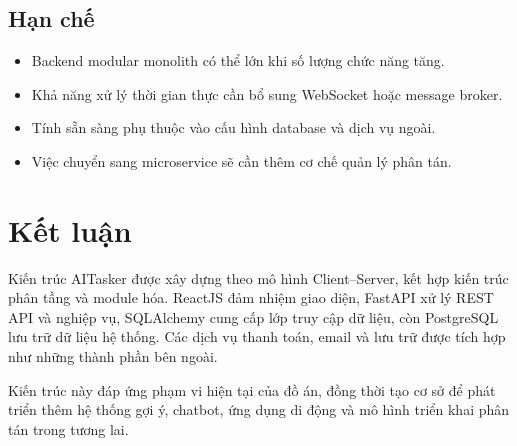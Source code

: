 \subsection{Hạn chế}

\begin{itemize}
    \item Backend modular monolith có thể lớn khi số lượng chức năng tăng.
    \item Khả năng xử lý thời gian thực cần bổ sung WebSocket hoặc message broker.
    \item Tính sẵn sàng phụ thuộc vào cấu hình database và dịch vụ ngoài.
    \item Việc chuyển sang microservice sẽ cần thêm cơ chế quản lý phân tán.
\end{itemize}

\section{Kết luận}
\label{sec:architecture-conclusion}

Kiến trúc AITasker được xây dựng theo mô hình Client--Server, kết hợp kiến trúc phân tầng và module hóa. ReactJS đảm nhiệm giao diện, FastAPI xử lý REST API và nghiệp vụ, SQLAlchemy cung cấp lớp truy cập dữ liệu, còn PostgreSQL lưu trữ dữ liệu hệ thống. Các dịch vụ thanh toán, email và lưu trữ được tích hợp như những thành phần bên ngoài.

Kiến trúc này đáp ứng phạm vi hiện tại của đồ án, đồng thời tạo cơ sở để phát triển thêm hệ thống gợi ý, chatbot, ứng dụng di động và mô hình triển khai phân tán trong tương lai.
